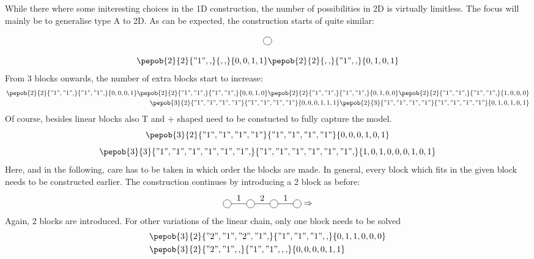 While there where some initeresting choices in the 1D construction, the number of possibilities in 2D is virtually limitless. The focus will mainly be to generalise type A to 2D. As can be expected, the construction starts of quite similar:

\begin{equation}
    \mpob{1}{ {,}  }{}{}{}{{,,}}
\end{equation}

\begin{equation}
    \pepob{2}{2}{{"1",,}}{{,,}}{{0,0,1,1}}  \pepob{2}{2}{{,,}}{{"1",,}}{{0,1,0,1}}
\end{equation}
From 3 blocks onwards, the number of extra blocks start to increase:
\begin{equation}
    \begin{split}
        \pepob{2}{2}{{"1","1",}}{{"1","1",}}{{0,0,0,1}}  \pepob{2}{2}{{"1","1",}}{{"1","1",}}{{0,0,1,0}}\pepob{2}{2}{{"1","1",}}{{"1","1",}}{{0,1,0,0}} \pepob{2}{2}{{"1","1",}}{{"1","1",}}{{1,0,0,0}}\\
        \pepob{3}{2}{{"1","1","1","1"}}{{"1","1","1","1"}}{{0,0,0,1,1,1}} \pepob{2}{3}{{"1","1","1","1"}}{{"1","1","1","1"}}{{0,1,0,1,0,1}}
    \end{split}
\end{equation}
Of course, besides linear blocks also T and + shaped need to be constucted to fully capture the model.
\begin{equation}
    \pepob{3}{2}{{"1","1","1","1"}}{{"1","1","1","1"}}{{0,0,0,1,0,1}}
\end{equation}
\begin{equation}
    \pepob{3}{3}{{"1","1","1","1","1","1",}}{{"1","1","1","1","1","1",}}{{1,0,1,0,0,0,1,0,1}}
\end{equation}
Here, and in the following, care has to be taken in which order the blocks are made. In general, every block which fits in the given block needs to be constructed earlier. The construction continues by introducing a 2 block as before:
\begin{equation}
    \mpob{4}{ {,"1","2","1",}  }{}{}{}{{,,,,,}} \Rightarrow
\end{equation}
Again, 2 blocks are introduced. For other variations of the linear chain, only one block needs to be solved
\begin{equation}
    \begin{split}
        &\pepob{3}{2}{{"2","1","2","1",}}{{"1","1","1",,}}{{0,1,1,0,0,0}}\\
        &\pepob{3}{2}{{"2","1",,}}{{"1","1",,,}}{{0,0,0,0,1,1}}
    \end{split}
\end{equation}
